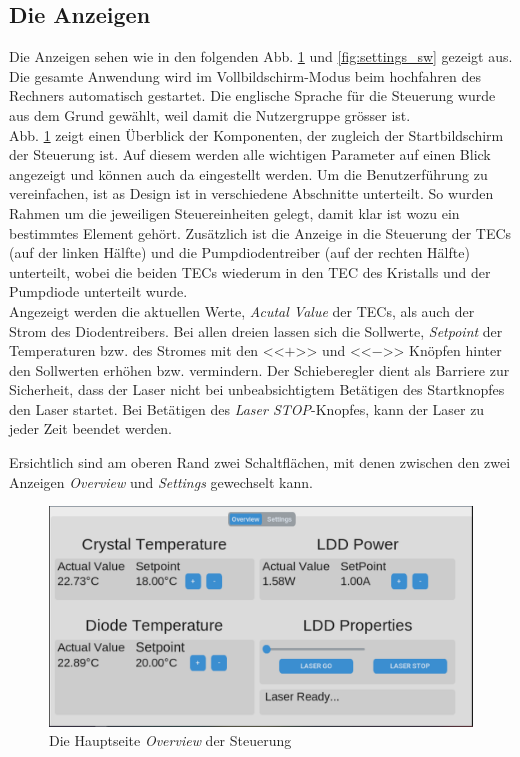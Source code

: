 \subsection{Die Anzeigen}
Die Anzeigen sehen wie in den folgenden Abb. \ref{fig:overview_sw} und \ref{fig:settings_sw} gezeigt aus. Die gesamte Anwendung wird im Vollbildschirm-Modus beim hochfahren des Rechners automatisch gestartet. Die englische Sprache für die Steuerung wurde aus dem Grund gewählt, weil damit die Nutzergruppe grösser ist.\\
Abb. \ref{fig:overview_sw} zeigt einen Überblick der Komponenten, der zugleich der Startbildschirm der Steuerung ist. Auf diesem werden alle wichtigen Parameter auf einen Blick angezeigt und können auch da eingestellt werden. Um die Benutzerführung zu vereinfachen, ist as Design ist in verschiedene Abschnitte unterteilt. So wurden Rahmen um die jeweiligen Steuereinheiten gelegt, damit klar ist wozu ein bestimmtes Element gehört. Zusätzlich ist die Anzeige in die Steuerung der TECs (auf der linken Hälfte) und die Pumpdiodentreiber (auf der rechten Hälfte) unterteilt, wobei die beiden TECs wiederum in den TEC des Kristalls und der Pumpdiode unterteilt wurde.\\
Angezeigt werden die aktuellen Werte, \textit{Acutal Value} der TECs, als auch der Strom des Diodentreibers. Bei allen dreien lassen sich die Sollwerte, \textit{Setpoint} der Temperaturen bzw. des Stromes mit den <<$+$>> und <<$-$>> Knöpfen hinter den Sollwerten erhöhen bzw. vermindern.
Der Schieberegler dient als Barriere zur Sicherheit, dass der Laser nicht bei unbeabsichtigtem Betätigen des Startknopfes den Laser startet. Bei Betätigen des \textit{Laser STOP}-Knopfes, kann der Laser zu jeder Zeit beendet werden.

Ersichtlich sind am oberen Rand zwei Schaltflächen, mit denen zwischen den zwei Anzeigen \textit{Overview} und \textit{Settings} gewechselt kann.

\begin{figure}[H]
    \centering
    \includegraphics[scale=0.3, trim={1mm 1mm 1mm 1mm}, clip]{98_images/window_overview_large_04.PNG}
    \caption{Die Hauptseite \textit{Overview} der Steuerung}
    \label{fig:overview_sw}
\end{figure}

